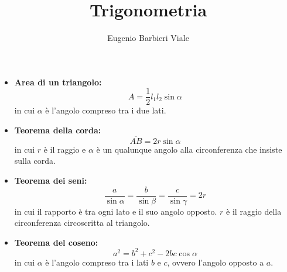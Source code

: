 \documentclass[]{article}
\title{Trigonometria}
\author{Eugenio Barbieri Viale}
\begin{document}
\maketitle
\begin{itemize}
    \item \textbf{Area di un triangolo:}
        $$ A = \frac{1}{2} l_1 l_2 \sin{\alpha} $$
        in cui $\alpha$ è l'angolo compreso tra i due lati.

    \item \textbf{Teorema della corda:}
        $$ \overline{AB} = 2r\sin{\alpha} $$
        in cui $r$ è il raggio e $\alpha$ è un qualunque angolo alla circonferenza che insiste sulla corda.

    \item \textbf{Teorema dei seni:}
        $$ \frac{a}{\sin{\alpha}} = \frac{b}{\sin{\beta}} = \frac{c}{\sin{\gamma}} = 2r $$
        in cui il rapporto è tra ogni lato e il suo angolo opposto. $r$ è il raggio della circonferenza circoscritta al triangolo.

    \item \textbf{Teorema del coseno:}
        $$ a^2 = b^2 + c^2 - 2bc\cos{\alpha} $$
        in cui $\alpha$ è l'angolo compreso tra i lati $b$ e $c$, ovvero l'angolo opposto a $a$.
\end{itemize}
\end{document}
